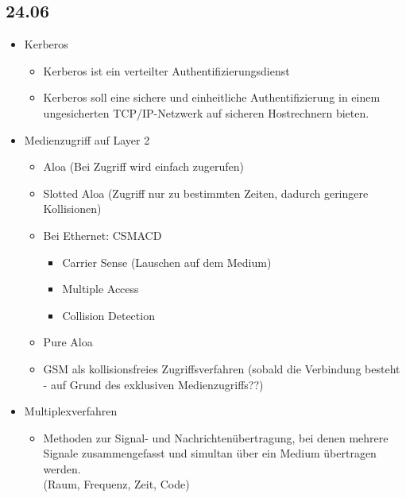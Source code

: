 \documentclass{article} %
\begin{document}
	\subsection{24.06}
	\begin{itemize}
		\item Kerberos 
		\begin{itemize}
			\item Kerberos ist ein verteilter Authentifizierungsdienst
			\item Kerberos soll eine sichere und einheitliche Authentifizierung in einem ungesicherten TCP/IP-Netzwerk auf sicheren Hostrechnern bieten.
		\end{itemize}
		\item Medienzugriff auf Layer 2
		\begin{itemize}
			\item Aloa (Bei Zugriff wird einfach zugerufen)
			\item Slotted Aloa (Zugriff nur zu bestimmten Zeiten, dadurch geringere Kollisionen)
			\item Bei Ethernet: CSMACD
			\begin{itemize}
				\item Carrier Sense (Lauschen auf dem Medium)
				\item Multiple Access
				\item Collision Detection 
			\end{itemize}
			\item Pure Aloa
			\item GSM als kollisionsfreies Zugriffsverfahren (sobald die Verbindung besteht - auf Grund des exklusiven Medienzugriffs??)
		\end{itemize}
		\item Multiplexverfahren
		\begin{itemize}
			\item Methoden zur Signal- und Nachrichtenübertragung, bei denen mehrere Signale zusammengefasst und simultan über ein Medium übertragen werden.\\
			(Raum, Frequenz, Zeit, Code)
		\end{itemize}
	\end{itemize}
\end{document}
